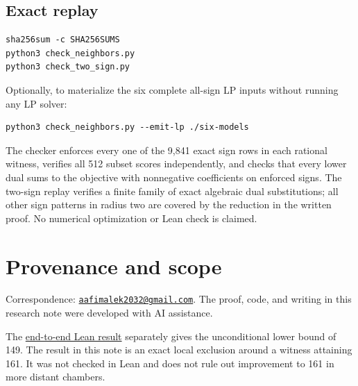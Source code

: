 \documentclass[
  11pt,
]{article}
\begin{document}
\subsection{Exact replay}\label{exact-replay}

\begin{verbatim}
sha256sum -c SHA256SUMS
python3 check_neighbors.py
python3 check_two_sign.py
\end{verbatim}

Optionally, to materialize the six complete all-sign LP inputs without
running any LP solver:

\begin{verbatim}
python3 check_neighbors.py --emit-lp ./six-models
\end{verbatim}

The checker enforces every one of the 9,841 exact sign rows in each
rational witness, verifies all 512 subset scores independently, and
checks that every lower dual sums to the objective with nonnegative
coefficients on enforced signs. The two-sign replay verifies a finite
family of exact algebraic dual substitutions; all other sign patterns in
radius two are covered by the reduction in the written proof. No
numerical optimization or Lean check is claimed.

\section{Provenance and scope}\label{provenance-and-scope}

Correspondence:
\href{mailto:aafimalek2032@gmail.com}{\nolinkurl{aafimalek2032@gmail.com}}.
The proof, code, and writing in this research note were developed with
AI assistance.

The
\href{https://github.com/Aafimalek/novel-discoveries/tree/76beffd491584923083c1c3d8f2abe637dde12a3/nine-separated-subset-sums/verification/lean-real-149}{end-to-end
Lean result} separately gives the unconditional lower bound of 149. The
result in this note is an exact local exclusion around a witness
attaining 161. It was not checked in Lean and does not rule out
improvement to 161 in more distant chambers.
\end{document}
